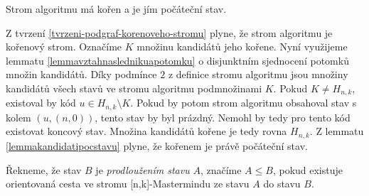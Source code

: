 \begin{tvrz}\label{tvrzkorenstromualg}
    Strom algoritmu má kořen a je jím počáteční stav. 
\end{tvrz}
\begin{dukaz}
    Z tvrzení \ref{tvrzeni-podgraf-korenoveho-stromu} plyne, že strom algoritmu je kořenový strom. Označíme $K$ množinu kandidátů jeho kořene.
    Nyní využijeme lemmatu \ref{lemmavztahnaslednikuapotomku} o disjunktním sjednocení potomků množin kandidátů. Díky podmínce $2$ z definice stromu algoritmu jsou množiny kandidátů všech stavů ve stromu algoritmu podmnožinami $K$. Pokud $K \neq H_{n,k}$, existoval by kód $u \in H_{n,k} \setminus K$. Pokud by potom strom algoritmu obsahoval stav s kolem $(u, (n,0))$, tento stav by byl prázdný. Nemohl by tedy pro tento kód existovat koncový stav. Množina kandidátů kořene je tedy rovna $H_{n,k}$. Z lemmatu \ref{lemmakandidatipocstavu} plyne, že kořenem je právě počáteční stav. 
\end{dukaz}

\begin{definice}
    Řekneme, že stav $B$ je \emph{prodloužením stavu} $A$, značíme $A \leq B$, pokud existuje orientovaná cesta ve stromu [n,k]-Mastermindu ze stavu $A$ do stavu $B$. 
\end{definice}


